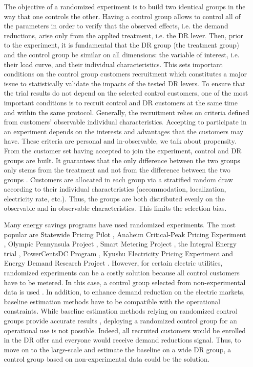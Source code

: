 \documentclass[journal]{IEEEtran}
\begin{document}
The objective of a randomized experiment is to build two identical groups in the way 
that one controls the other. Having a control group allows to control 
all of the parameters in order to verify that the observed 
effects, i.e. the demand reductions, arise only from the applied treatment, i.e. 
the DR lever. Then, prior to the experiment, it is fundamental that the DR group 
(the treatment group) and the control group be similar on all dimensions: the variable 
of interest, i.e. their load curve, and their individual characteristics. This sets 
important conditions on the control group customers recruitment which constitutes a 
major issue to statistically validate the impacts of the tested DR levers. 
To ensure that the trial results do not depend on the selected control customers, one of the most 
important conditions is to recruit control and DR customers at the 
same time and within the same protocol. Generally, the recruitment relies on criteria defined 
from customers' observable individual characteristics. Accepting to participate in an 
experiment depends on the interests and advantages that the customers may have. These 
criteria are personal and in-observable, we talk about propensity. From 
the customer set having accepted to join the experiment, control and DR groups are 
built. It guarantees that the only difference between the two groups only 
stems from the treatment and not from the difference between the two 
groups \cite{behavorial_energy_policy}. Customers are allocated in each group via 
a stratified random draw according to 
their individual characteristics (accommodation, localization, electricity rate, etc.). 
Thus, the groups are both distributed evenly on the observable and in-observable 
characteristics. This limits the selection bias.

Many energy savings programs have used randomized experiments. The most popular 
are Statewide Pricing Pilot \cite{CG_california}, Anaheim Critical-Peak Pricing 
Experiment \cite{ACPPE}, Olympic Pennynsula Project \cite{OPP}, Smart Metering 
Project \cite{CERai}, the Integral Energy trial \cite{NERA}, PowerCentsDC 
Program \cite{PCDC}, Kyushu Electricity Pricing Experiment \cite{japon} and 
Energy Demand Research Project \cite{EDRP}. However, for certain electric utilities, 
randomized experiments can be a costly solution because all control customers have to be 
metered. In this case, a control group selected from non-experimental data 
is used \cite{social_norms,newsham_birt_rowlands}. In addition, to enhance 
demand reduction on the electric markets, baseline estimation methods have 
to be compatible with the operational constraints. While baseline estimation 
methods relying on randomized control groups provide accurate results 
\cite{Rex_baseline,social_norms}, deploying a randomized control group 
for an operational use is not possible. Indeed, all recruited customers would be enrolled 
in the DR offer and everyone would receive demand reductions signal. Thus, to move on to 
the large-scale and estimate the baseline on a wide DR group, a control group based on 
non-experimental data could be the solution.
\end{document}
